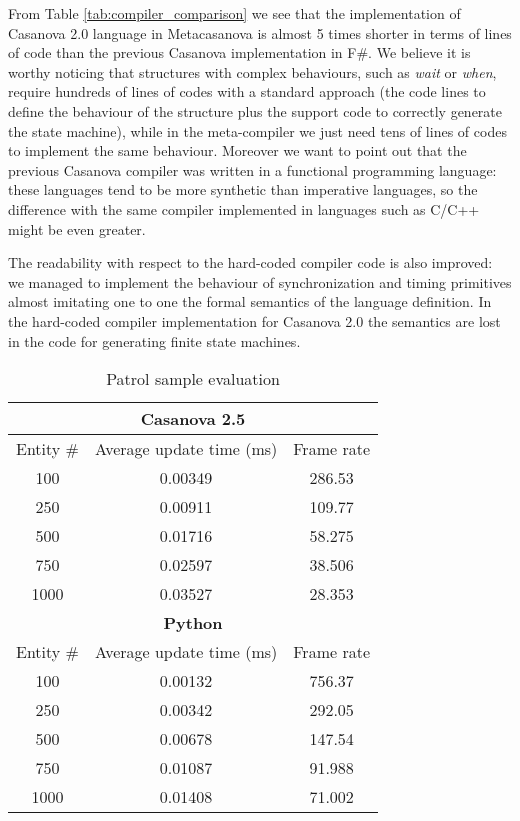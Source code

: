 From Table \ref{tab:compiler_comparison} we see that the implementation of Casanova 2.0 language in Metacasanova is almost 5 times shorter in terms of lines of code than the previous Casanova implementation in F\#. We believe it is worthy noticing that structures with complex behaviours, such as \textit{wait} or \textit{when}, require hundreds of lines of codes with a standard approach (the code lines to define the behaviour of the structure plus the support code to correctly generate the state machine), while in the meta-compiler we just need tens of lines of codes to implement the same behaviour. Moreover we want to point out that the previous Casanova compiler was written in a functional programming language: these languages tend to be more synthetic than imperative languages, so the difference with the same compiler implemented in languages such as C/C++ might be even greater.

The readability with respect to the hard-coded compiler code is also improved: we managed to implement the behaviour of synchronization and timing primitives almost imitating one to one the formal semantics of the language definition. In the hard-coded compiler implementation for Casanova 2.0 the semantics are lost in the code for generating finite state machines.

\begin{table}
	\centering
	\tiny	
	\begin{tabular}{|c|c|c|}
		\hline
		\multicolumn{3}{|c|}{\textbf{Casanova 2.5}} \\
		\hline
		Entity \# & Average update time (ms) & Frame rate \\
		\hline
		100 & 0.00349 & 286.53 \\
		\hline
		250 & 0.00911 & 109.77 \\
		\hline
		500 & 0.01716 & 58.275 \\
		\hline
		750 & 0.02597 & 38.506 \\
		\hline
		1000 & 0.03527 & 28.353 \\
		\hline
		\multicolumn{3}{|c|}{\textbf{Python}} \\
		\hline
		Entity \# & Average update time (ms) & Frame rate \\
		\hline
		100 & 0.00132 & 756.37 \\
		\hline
		250 & 0.00342 & 292.05 \\
		\hline
		500 & 0.00678 & 147.54 \\
		\hline
		750 & 0.01087 & 91.988 \\
		\hline
		1000 & 0.01408 & 71.002 \\
		\hline
	\end{tabular}
	\caption{Patrol sample evaluation}
	\label{tab:evaluation}
\end{table}

